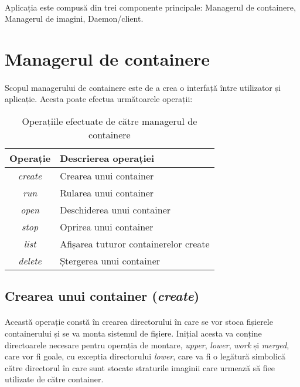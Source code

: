     \paragraph{} Aplicația este compusă din trei componente principale: Managerul de containere, Managerul de imagini, Daemon/client.

    \pagebreak
    \section{Managerul de containere}
        \paragraph{} Scopul managerului de containere este de a crea o interfață între utilizator și aplicație. Acesta poate efectua următoarele operații:
        \begin{table}[h!]
            \centering
            \begin{tabular}{ |c|l| }
                \hline
                \textbf{Operație} & \textbf{Descrierea operației}  \\
                \hline
                \textit{create} & Crearea unui container  \\
                \hline
                \textit{run}    & Rularea unui container  \\
                \hline
                \textit{open}   & Deschiderea unui container  \\
                \hline
                \textit{stop}   & Oprirea unui container  \\
                \hline
                \textit{list}   & Afișarea tuturor containerelor create  \\
                \hline
                \textit{delete} & Ștergerea unui container  \\
                \hline
            \end{tabular}
            \caption{Operațiile efectuate de către managerul de containere}
            \label{table:cmop}
        \end{table}

        \subsection{Crearea unui container (\textit{create})}
            \paragraph{} Această operație constă în crearea directorului în care se vor stoca fișierele containerului și se va monta sistemul de fișiere. Inițial acesta va conține directoarele necesare pentru operația de montare, \textit{upper}, \textit{lower}, \textit{work} și \textit{merged}, care vor fi goale, cu exceptia directorului \textit{lower}, care va fi o legătură simbolică către directorul în care sunt stocate straturile imaginii care urmează să fiee utilizate de către container.
